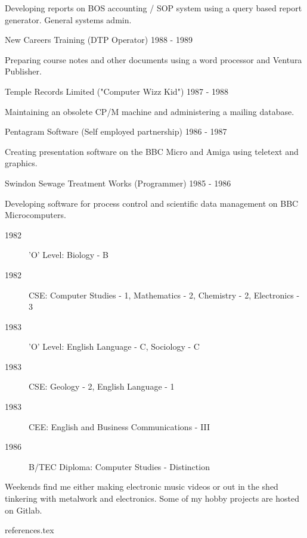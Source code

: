 Developing reports on BOS accounting / SOP system
using a query based report generator. General systems admin.

\jobHeading
    {New Careers Training (DTP Operator)}
    {1988 - 1989}

Preparing course notes and other documents
using a word processor and Ventura Publisher.

\jobHeading
    {Temple Records Limited ("Computer Wizz Kid")}
    {1987 - 1988}

Maintaining an obsolete CP/M machine and administering a mailing database.

\jobHeading
    {Pentagram Software (Self employed partnership)}
    {1986 - 1987}

Creating presentation software on the BBC Micro and Amiga
using teletext and graphics.

\jobHeading
    {Swindon Sewage Treatment Works (Programmer)}
    {1985 - 1986}

Developing software for process control and scientific data management
on BBC Microcomputers.



\begin{description}
    \item[1982] 'O' Level: Biology - B
    \item[1982] CSE: Computer Studies - 1, Mathematics - 2,
        Chemistry - 2, Electronics - 3
    \item[1983] 'O' Level: English Language - C, Sociology - C
    \item[1983] CSE: Geology - 2, English Language - 1
    \item[1983] CEE: English and Business Communications - III
\end{description}


\begin{description}
    \item[1986] B/TEC Diploma: Computer Studies - Distinction
\end{description}


Weekends find me either making electronic music videos
or out in the shed tinkering with metalwork and electronics.
Some of my hobby projects are hosted on Gitlab.


 {references.tex}
